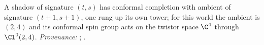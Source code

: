 A shadow of signature $(t,s)$ has conformal completion with ambient of signature $(t+1, s+1)$, one rung up its own tower; for this world the ambient is $(2,4)$ and its conformal spin group acts on the twistor space $\C^{4}$ through $\Cl^{0}(2,4)$. \emph{Provenance:} \cite[Fact~2.1, Thm.~3.4]{ButlerT9}; \cite[Fact~2.11]{ButlerT12}.
